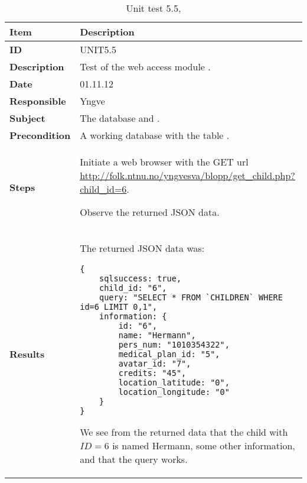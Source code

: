 \begin{table} %
	\begin{center}
		\begin{tabular}{|p{3.0cm}|p{14.0cm}|}
			\hline
			\bf{Item} & \bf{Description}\\
			\hline
			\bf{ID} & UNIT5.5\\
			\bf{Description} & Test of the web access module \code{get\_child.php}.\\
			\bf{Date} & 01.11.12\\
			\bf{Responsible} & Yngve\\
			\bf{Subject} & The database and \code{get\_child.php}.\\
			\bf{Precondition} & A working database with the table \code{CHILDREN}.\\
			\bf{Steps} &
			\begin{tabulenum}
				\item Initiate a web browser with the GET url \url{http://folk.ntnu.no/yngvesva/blopp/get\_child.php?child\_id=6}.
				\item Observe the returned JSON data.
			\end{tabulenum}\\
			\hline
			\bf{Results} &
			The returned JSON data was:
\begin{lstlisting}[caption=JSON result from \code{get\_child.php}]
{
	sqlsuccess: true,
	child_id: "6",
	query: "SELECT * FROM `CHILDREN` WHERE id=6 LIMIT 0,1",
	information: {
		id: "6",
		name: "Hermann",
		pers_num: "1010354322",
		medical_plan_id: "5",
		avatar_id: "7",
		credits: "45",
		location_latitude: "0",
		location_longitude: "0"
	}
}
\end{lstlisting}
			We see from the returned data that the child with $ID=6$ is named Hermann, some other information, and that the query works.
			\\
			\hline
		\end{tabular}
	\end{center}
	\caption{Unit test 5.5, }
	\label{tab:unit5.5}
\end{table}

